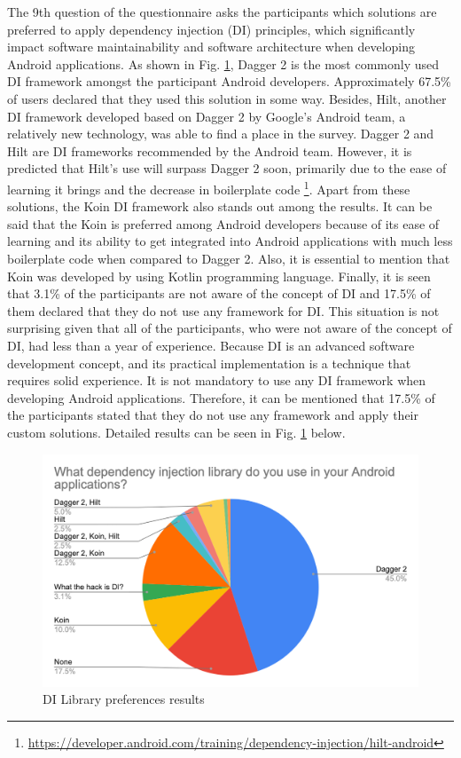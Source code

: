 The 9th question of the questionnaire asks the participants which solutions are preferred to apply dependency injection (DI) principles, which significantly impact software maintainability and software architecture when developing Android applications. As shown in Fig. \ref{fig:di_lib}, Dagger 2 is the most commonly used DI framework amongst the participant Android developers. Approximately 67.5\% of users declared that they used this solution in some way. Besides, Hilt, another DI framework developed based on Dagger 2 by Google's Android team, a relatively new technology, was able to find a place in the survey. Dagger 2 and Hilt are DI frameworks recommended by the Android team. However, it is predicted that Hilt's use will surpass Dagger 2 soon, primarily due to the ease of learning it brings and the decrease in boilerplate code  \footnote{\url{https://developer.android.com/training/dependency-injection/hilt-android}}. Apart from these solutions, the Koin DI framework also stands out among the results. It can be said that the Koin is preferred among Android developers because of its ease of learning and its ability to get integrated into Android applications with much less boilerplate code when compared to Dagger 2. Also, it is essential to mention that Koin was developed by using Kotlin programming language. Finally, it is seen that 3.1\% of the participants are not aware of the concept of DI and 17.5\% of them declared that they do not use any framework for DI. This situation is not surprising given that all of the participants, who were not aware of the concept of DI, had less than a year of experience. Because DI is an advanced software development concept, and its practical implementation is a technique that requires solid experience. It is not mandatory to use any DI framework when developing Android applications. Therefore, it can be mentioned that 17.5\% of the participants stated that they do not use any framework and apply their custom solutions. Detailed results can be seen in Fig. \ref{fig:di_lib} below.
\begin{figure}[ht!]
    \centering
    \includegraphics[scale=0.25]{figures/di_lib.png}
    \caption{DI Library preferences results}
    \label{fig:di_lib}
\end{figure}
\FloatBarrier

